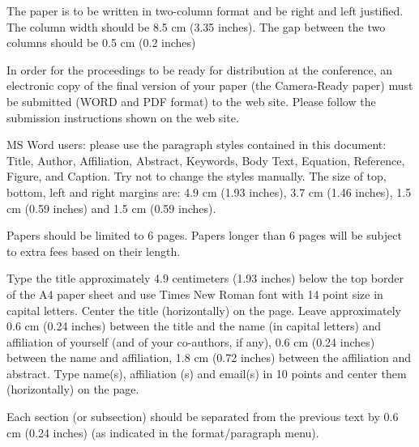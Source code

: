 \documentclass[a4paper, times, 10pt,twocolumn]{article}
\begin{document}
The paper is to be written in two-column format and be right and left justified. The column width should be 8.5 cm (3.35 inches). The gap between the two columns should be 0.5 cm (0.2 inches)





In order for the proceedings to be ready for distribution at the conference, an electronic copy of the final version of your paper (the Camera-Ready paper) must be submitted (WORD and PDF format) to the web site. Please follow the submission instructions shown on the web site.


MS Word users: please use the paragraph styles contained in this document: Title, Author, Affiliation, Abstract, Keywords, Body Text, Equation, Reference, Figure, and Caption. Try not to change the styles manually. The size of top, bottom, left and right margins are: 4.9 cm (1.93 inches), 3.7 cm (1.46 inches), 1.5 cm (0.59 inches) and 1.5 cm (0.59 inches).


Papers should be limited to 6 pages. Papers longer than 6 pages will be subject to extra fees based on their length.


Type the title approximately 4.9 centimeters (1.93 inches) below the top border of the A4 paper sheet and use Times New Roman font with 14 point size in capital letters. Center the title (horizontally) on the page. Leave approximately 0.6 cm (0.24 inches) between the title and the name (in capital letters) and affiliation of yourself (and of your co-authors, if any), 0.6 cm (0.24 inches) between the name and affiliation, 1.8 cm (0.72 inches) between the affiliation and abstract. Type name(s), affiliation (s) and email(s) in 10 points and center them (horizontally) on the page.


Each section (or subsection) should be separated from the previous text by 0.6 cm (0.24 inches) (as indicated in the format/paragraph menu).
\end{document}
